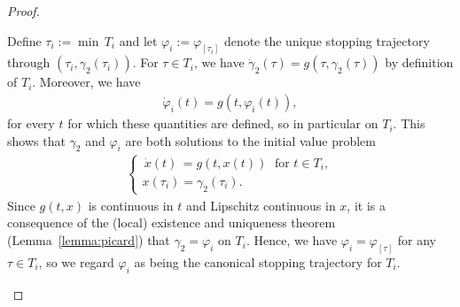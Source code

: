 \documentclass[a4paper]{article}
\theoremstyle{definition}
\theoremstyle{plain}
\begin{document}
\begin{proof}
\begin{outline}
  \2 Define $\tau_{i} := \min \, T_{i}$ and let $\varphi_{i} := \varphi_{[\tau_{i}]}$
  denote the unique stopping trajectory through $(\tau_{i}, \gamma_{2}(\tau_{i}))$.
  For $\tau \in T_{i}$, we have
  $\dot{\gamma}_{2}(\tau) = g(\tau, \gamma_{2}(\tau))$ by definition of $T_{i}$.
  Moreover, we have
  \begin{align}\label{eq:phi-tangent}
    \dot{\varphi}_{i}(t) = g(t, \varphi_{i}(t)),
  \end{align}
  for every $t$ for which these quantities are defined, so in particular on $T_{i}$.
  This shows that $\gamma_{2}$ and $\varphi_{i}$ are both solutions to the initial value problem
  \begin{align}
    \begin{cases}
      \,\dot{x}(t)\, = g(t, x(t)) \;  \text{ for } t \in T_{i} , \\
      x(\tau_{i}) = \gamma_{2}(\tau_{i}) .
    \end{cases}
  \end{align}
  Since $g(t, x)$ is continuous in $t$ and Lipschitz continuous in $x$, it is a
  consequence of the (local) existence and uniqueness theorem
  (Lemma~\ref{lemma:picard}) that $\gamma_{2} = \varphi_{i}$ on $T_{i}$.
  Hence, we have $\varphi_{i} = \varphi_{[\tau]}$ for any $\tau \in T_{i}$, so we regard
  $\varphi_{i}$ as being the canonical stopping trajectory for $T_{i}$.




\end{outline}
\end{proof}
\end{document}

